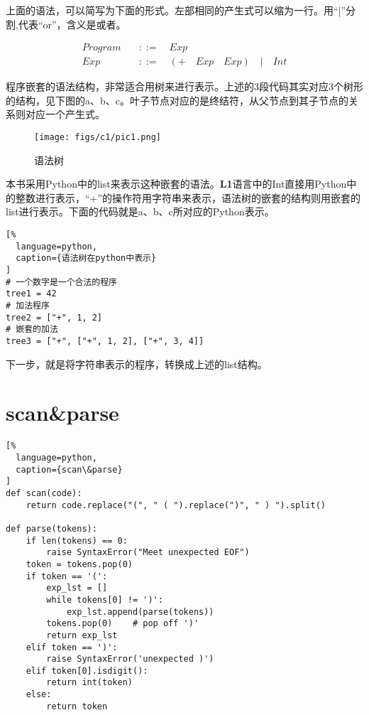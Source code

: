 上面的语法，可以简写为下面的形式。左部相同的产生式可以缩为一行。用“|”分割,代表“or”，含义是或者。

\begin{equation}
\begin{aligned}
  \label{eq:2}
   Program \quad &::= \quad Exp \\
   Exp \quad &::= \quad (+ \quad Exp \quad Exp) \quad | \quad Int
\end{aligned}
\end{equation}

程序嵌套的语法结构，非常适合用树来进行表示。上述的3段代码其实对应3个树形的结构，见下图的a、b、c。叶子节点对应的是终结符，从父节点到其子节点的关系则对应一个产生式。

\begin{figure}[ht]
\centering
\texttt{[image: figs/c1/pic1.png]}
\caption{语法树}
\label{fig:fig1}
\end{figure}

本书采用Python中的list来表示这种嵌套的语法。\textbf{L1}语言中的Int直接用Python中的整数进行表示，“+”的操作符用字符串来表示，语法树的嵌套的结构则用嵌套的list进行表示。下面的代码就是a、b、c所对应的Python表示。

\begin{lstlisting}[%
  language=python,
  caption={语法树在python中表示}
]
# 一个数字是一个合法的程序
tree1 = 42
# 加法程序
tree2 = ["+", 1, 2]
# 嵌套的加法
tree3 = ["+", ["+", 1, 2], ["+", 3, 4]]
\end{lstlisting}

下一步，就是将字符串表示的程序，转换成上述的list结构。


\section{scan\&parse}



\begin{lstlisting}[%
  language=python,
  caption={scan\&parse}
]
def scan(code):
    return code.replace("(", " ( ").replace(")", " ) ").split()

def parse(tokens):
    if len(tokens) == 0:
        raise SyntaxError("Meet unexpected EOF")
    token = tokens.pop(0)
    if token == '(':
        exp_lst = []
        while tokens[0] != ')':
            exp_lst.append(parse(tokens))
        tokens.pop(0)    # pop off ')'
        return exp_lst
    elif token == ')':
        raise SyntaxError('unexpected )')
    elif token[0].isdigit():
        return int(token)
    else:
        return token
\end{lstlisting}